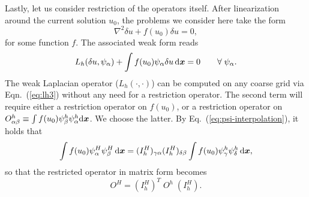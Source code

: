 
Lastly, let us consider restriction of the operators itself.  After linearization  around the current solution $u_0$, the problems we consider here take the form
%
\begin{equation}\label{eq:temp-F}
\nabla^2\delta u + f(u_0)\delta u = 0,
\end{equation}
%
for some function $f$. The associated weak form reads
%
\begin{equation}
L_{h}( \delta u, \psi_\alpha) + \int f(u_0)\psi_\alpha \delta u\,\mathrm{d}\boldsymbol{x} = 0\qquad\forall\; \psi_\alpha.
\end{equation}
%
The weak Laplacian operator ($L_{h}(\cdot,\cdot)$) can be computed on any coarse grid via Eqn.~(\ref{eq:lh3}) without any need for a restriction operator. The second term will require either a restriction operator on $f(u_0)$, or a restriction operator on $O^{h}_{\alpha\beta}\equiv\int f(u_0)\psi^h_\beta\psi^h_\alpha \mathrm{d} \boldsymbol{x}$.  We choose the latter. By Eq.~(\ref{eq:psi-interpolation}), it holds that 
  \begin{equation}\label{eq:temp-H}
\int f(u_0) \psi_\alpha^{H}\psi_\beta^{H}\,\mathrm{d}\boldsymbol{x}
    =(I_{h}^{H})_{\gamma\alpha}(I_{h}^{H})_{\delta\beta}\int f(u_0)\psi_\gamma^{h}\psi_\delta^{h}\,\mathrm{d}\boldsymbol{x},
  \end{equation}
  so that the restricted operator in matrix form becomes
  \begin{equation}
    \label{eqn:operator_oh}
      O^{H} = (I_{h}^{H})^T\;O^{h}\;(I_{h}^{H}).
    \end{equation}

%
%



